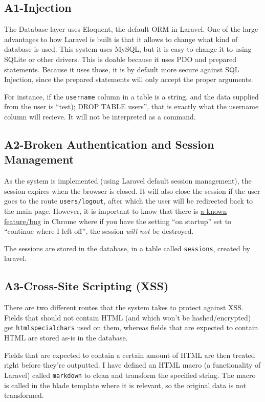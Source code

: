 \subsection{A1-Injection}

The Database layer uses Eloquent, the default ORM in Laravel. One of the
large advantages to how Laravel is built is that it allows to change
what kind of database is used. This system uses MySQL, but it is easy to
change it to using SQLite or other drivers. This is doable because it
uses PDO and prepared statements. Because it uses those, it is by
default more secure against SQL Injection, since the prepared statements
will only accept the proper arguments.

For instance, if the \texttt{username} column in a table is a string,
and the data supplied from the user is ``test); DROP TABLE users'', that
is exactly what the username column will recieve. It will not be
interpreted as a command.

\subsection{A2-Broken Authentication and Session Management}

As the system is implemented (using Laravel default session management),
the session expires when the browser is closed. It will also close the
session if the user goes to the route \texttt{users/logout}, after which
the user will be redirected back to the main page. However, it is
important to know that there is
\href{https://productforums.google.com/d/msg/chrome/9l-gKYIUg50/HOvdZbPiuXAJ}{a
known feature/bug} in Chrome where if you have the setting ``on
startup'' set to ``continue where I left off'', the session \emph{will
not} be destroyed.

The sessions are stored in the database, in a table called
\texttt{sessions}, created by laravel.

\subsection{A3-Cross-Site Scripting (XSS)}

There are two different routes that the system takes to protect against
XSS. Fields that should not contain HTML (and which won't be
hashed/encrypted) get \texttt{htmlspecialchars} used on them, whereas
fields that are expected to contain HTML are stored as-is in the
database.

Fields that are expected to contain a certain amount of HTML are then
treated right before they're outputted. I have defined an HTML macro (a
functionality of Laravel) called \texttt{markdown} to clean and
transform the specified string. The macro is called in the blade
template where it is relevant, so the original data is not transformed.

